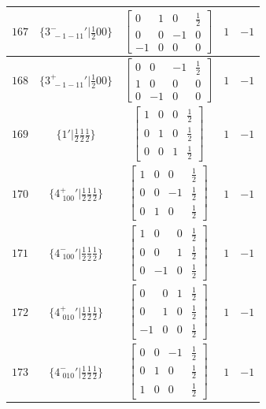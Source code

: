 \documentclass[fleqn,8pt]{jsarticle}
\begin{document}
\begin{longtable}{ccccc}
$ 167 $ & $ \{3^{-}_{\,\,-1-11}{}'|\frac{1}{2} 0 0\} $ & $ \begin{bmatrix} 0 & 1 & 0 & \frac{1}{2} \\ 0 & 0 & -1 & 0 \\ -1 & 0 & 0 & 0 \end{bmatrix} $ & $ 1 $ & $ -1 $ \\ \hline
$ 168 $ & $ \{3^{+}_{\,\,-1-11}{}'|\frac{1}{2} 0 0\} $ & $ \begin{bmatrix} 0 & 0 & -1 & \frac{1}{2} \\ 1 & 0 & 0 & 0 \\ 0 & -1 & 0 & 0 \end{bmatrix} $ & $ 1 $ & $ -1 $ \\ \hline
$ 169 $ & $ \{1{}'|\frac{1}{2} \frac{1}{2} \frac{1}{2}\} $ & $ \begin{bmatrix} 1 & 0 & 0 & \frac{1}{2} \\ 0 & 1 & 0 & \frac{1}{2} \\ 0 & 0 & 1 & \frac{1}{2} \end{bmatrix} $ & $ 1 $ & $ -1 $ \\ \hline
$ 170 $ & $ \{4^{+}_{\,\,100}{}'|\frac{1}{2} \frac{1}{2} \frac{1}{2}\} $ & $ \begin{bmatrix} 1 & 0 & 0 & \frac{1}{2} \\ 0 & 0 & -1 & \frac{1}{2} \\ 0 & 1 & 0 & \frac{1}{2} \end{bmatrix} $ & $ 1 $ & $ -1 $ \\ \hline
$ 171 $ & $ \{4^{-}_{\,\,100}{}'|\frac{1}{2} \frac{1}{2} \frac{1}{2}\} $ & $ \begin{bmatrix} 1 & 0 & 0 & \frac{1}{2} \\ 0 & 0 & 1 & \frac{1}{2} \\ 0 & -1 & 0 & \frac{1}{2} \end{bmatrix} $ & $ 1 $ & $ -1 $ \\ \hline
$ 172 $ & $ \{4^{+}_{\,\,010}{}'|\frac{1}{2} \frac{1}{2} \frac{1}{2}\} $ & $ \begin{bmatrix} 0 & 0 & 1 & \frac{1}{2} \\ 0 & 1 & 0 & \frac{1}{2} \\ -1 & 0 & 0 & \frac{1}{2} \end{bmatrix} $ & $ 1 $ & $ -1 $ \\ \hline
$ 173 $ & $ \{4^{-}_{\,\,010}{}'|\frac{1}{2} \frac{1}{2} \frac{1}{2}\} $ & $ \begin{bmatrix} 0 & 0 & -1 & \frac{1}{2} \\ 0 & 1 & 0 & \frac{1}{2} \\ 1 & 0 & 0 & \frac{1}{2} \end{bmatrix} $ & $ 1 $ & $ -1 $ \\ \hline

\end{longtable}
\end{document}
